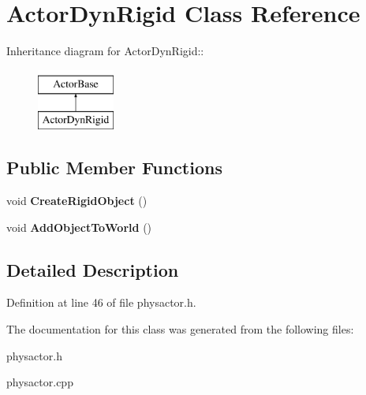 \hypertarget{classActorDynRigid}{
\section{ActorDynRigid Class Reference}
\label{d4/d0e/classActorDynRigid}
}
Inheritance diagram for ActorDynRigid::\begin{figure}[H]
\begin{center}
\leavevmode
\includegraphics[height=2cm]{d4/d0e/classActorDynRigid}
\end{center}
\end{figure}
\subsection*{Public Member Functions}
\begin{DoxyCompactItemize}
\item 
\hypertarget{classActorDynRigid_aa537dd154a64e34d5c08f660affc4300}{
void {\bfseries CreateRigidObject} ()}
\label{d4/d0e/classActorDynRigid_aa537dd154a64e34d5c08f660affc4300}

\item 
\hypertarget{classActorDynRigid_a5677d046cf6d0bbc6992b93e10290e6c}{
void {\bfseries AddObjectToWorld} ()}
\label{d4/d0e/classActorDynRigid_a5677d046cf6d0bbc6992b93e10290e6c}

\end{DoxyCompactItemize}


\subsection{Detailed Description}


Definition at line 46 of file physactor.h.

The documentation for this class was generated from the following files:\begin{DoxyCompactItemize}
\item 
physactor.h\item 
physactor.cpp\end{DoxyCompactItemize}
